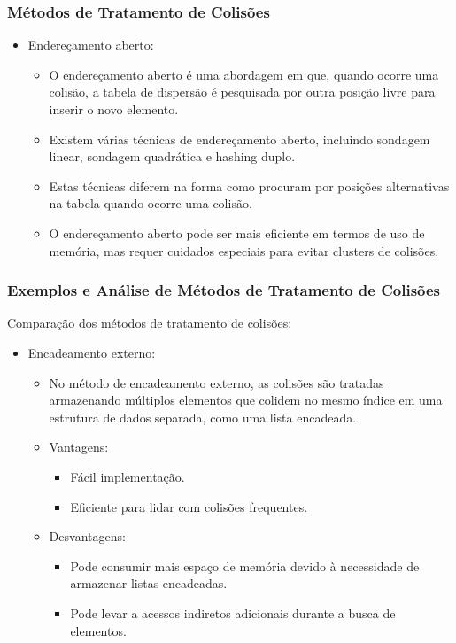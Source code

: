 \begin{frame}[fragile]
  \frametitle{Métodos de Tratamento de Colisões}
  \begin{itemize}
    \item Endereçamento aberto:
      \begin{itemize}
        \item O endereçamento aberto é uma abordagem em que, quando ocorre uma colisão, a tabela de dispersão é pesquisada por outra posição livre para inserir o novo elemento.
        \item Existem várias técnicas de endereçamento aberto, incluindo sondagem linear, sondagem quadrática e hashing duplo.
        \item Estas técnicas diferem na forma como procuram por posições alternativas na tabela quando ocorre uma colisão.
        \item O endereçamento aberto pode ser mais eficiente em termos de uso de memória, mas requer cuidados especiais para evitar clusters de colisões.
      \end{itemize}
  \end{itemize}
\end{frame}



\begin{frame}[fragile]
  \frametitle{Exemplos e Análise de Métodos de Tratamento de Colisões}
Comparação dos métodos de tratamento de colisões:
      \begin{itemize}
        \item Encadeamento externo:
          \begin{itemize}
            \item No método de encadeamento externo, as colisões são tratadas armazenando múltiplos elementos que colidem no mesmo índice em uma estrutura de dados separada, como uma lista encadeada.
            \item Vantagens:
              \begin{itemize}
                \item Fácil implementação.
                \item Eficiente para lidar com colisões frequentes.
              \end{itemize}
            \item Desvantagens:
              \begin{itemize}
                \item Pode consumir mais espaço de memória devido à necessidade de armazenar listas encadeadas.
                \item Pode levar a acessos indiretos adicionais durante a busca de elementos.
              \end{itemize}
          \end{itemize}
      \end{itemize}
\end{frame}

